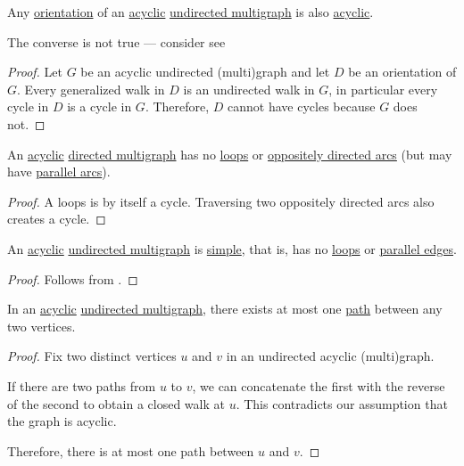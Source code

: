 \begin{proposition}\label{thm:acyclic_undirected_graph_orientation}
  Any \hyperref[def:multigraph_orientation]{orientation} of an \hyperref[def:acyclic_graph]{acyclic} \hyperref[def:hypergraph/multigraph]{undirected multigraph} is also \hyperref[def:acyclic_graph]{acyclic}.
\end{proposition}
\begin{comments}
  \item The converse is not true --- consider see 
\end{comments}
\begin{proof}
  Let \( G \) be an acyclic undirected (multi)graph and let \( D \) be an orientation of \( G \). Every generalized walk in \( D \) is an undirected walk in \( G \), in particular every cycle in \( D \) is a cycle in \( G \). Therefore, \( D \) cannot have cycles because \( G \) does not.
\end{proof}

\begin{proposition}\label{thm:acyclic_directed_multigraph}
  An \hyperref[def:acyclic_graph]{acyclic} \hyperref[def:directed_multigraph]{directed multigraph} has no \hyperref[def:directed_multigraph/loop]{loops} or \hyperref[def:directed_multigraph/parallel]{oppositely directed arcs} (but may have \hyperref[def:directed_multigraph/parallel]{parallel arcs}).
\end{proposition}
\begin{proof}
  A loops is by itself a cycle. Traversing two oppositely directed arcs also creates a cycle.
\end{proof}

\begin{proposition}\label{thm:acyclic_undirected_multigraph}
  An \hyperref[def:acyclic_graph]{acyclic} \hyperref[def:hypergraph/multigraph]{undirected multigraph} is \hyperref[def:undirected_graph]{simple}, that is, has no \hyperref[def:hypergraph/loop]{loops} or \hyperref[def:hypergraph/parallel]{parallel edges}.
\end{proposition}
\begin{proof}
  Follows from .
\end{proof}

\begin{proposition}\label{thm:acyclic_graph_paths}
  In an \hyperref[def:acyclic_graph]{acyclic} \hyperref[def:hypergraph/multigraph]{undirected multigraph}, there exists at most one \hyperref[def:graph_walk/path]{path} between any two vertices.
\end{proposition}
\begin{proof}
  Fix two distinct vertices \( u \) and \( v \) in an undirected acyclic (multi)graph.

  If there are two paths from \( u \) to \( v \), we can concatenate the first with the reverse of the second to obtain a closed walk at \( u \). This contradicts our assumption that the graph is acyclic.

  Therefore, there is at most one path between \( u \) and \( v \).
\end{proof}

